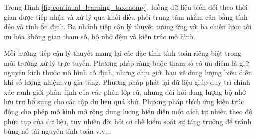 Trong Hình \ref{fig:continual_learning_taxonomy}, luồng dữ liệu biến đổi theo thời gian được tiếp nhận và xử lý qua khối điều phối trung tâm nhằm cân bằng tính dẻo và tính ổn định. Ba nhánh tiếp cận lý thuyết tương ứng với ba chiến lược tối ưu hóa không gian tham số, bộ nhớ đệm và kiến trúc mô hình.

Mỗi hướng tiếp cận lý thuyết mang lại các đặc tính tính toán riêng biệt trong môi trường xử lý trực tuyến. Phương pháp ràng buộc tham số có ưu điểm là giữ nguyên kích thước mô hình cố định, nhưng chịu giới hạn về dung lượng biểu diễn khi số lượng nhiệm vụ gia tăng. Phương pháp phát lại dữ liệu giúp duy trì chính xác ranh giới phân định của các phân lớp cũ, nhưng đòi hỏi dung lượng bộ nhớ lưu trữ bổ sung cho các tập dữ liệu quá khứ. Phương pháp thích ứng kiến trúc động cho phép mô hình mở rộng dung lượng biểu diễn một cách tự nhiên theo độ phức tạp của dữ liệu, tuy nhiên đòi hỏi cơ chế kiểm soát sự tăng trưởng để tránh bùng nổ tài nguyên tính toán v.v...